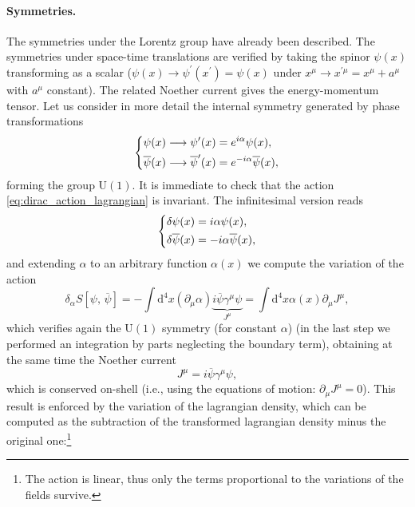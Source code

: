 \paragraph{Symmetries.}
The symmetries under the Lorentz group have already been described. The symmetries under space-time translations are verified by taking the spinor \(\psi(x)\) transforming as a scalar (\(\psi(x) \to \psi^{\prime}(x^{\prime}) = \psi(x)\) under \(x^{\mu} \to x^{\prime \mu} = x^{\mu} + a^{\mu}\) with \(a^{\mu}\) constant). The related Noether current gives the energy-momentum tensor.
Let us consider in more detail the internal symmetry generated by phase transformations
\begin{equation}
    \begin{dcases}
        \psi(x) \longrightarrow \psi^{\prime}(x) = e^{i \alpha} \psi(x), \\
        \overline{\psi}(x) \longrightarrow \overline{\psi}^{\prime}(x) = e^{-i \alpha} \overline{\psi}(x),
    \end{dcases}
    \label{eq:dirac_U1_transformation}
\end{equation}
forming the group \(\mathrm{U}(1)\). It is immediate to check that the action \eqref{eq:dirac_action_lagrangian} is invariant. The infinitesimal version reads
\[
    \begin{dcases}
        \delta \psi(x) = i \alpha \psi(x), \\
        \delta \overline{\psi}(x) = -i \alpha \overline{\psi}(x),
    \end{dcases}
\]
and extending \(\alpha\) to an arbitrary function \(\alpha(x)\) we compute the variation of the action
\[
    \delta_{\alpha} S [\psi,\,\overline{\psi}] = - \int \mathrm{d}^4 x (\partial_\mu \alpha) \underbrace{i \overline{\psi} \gamma^{\mu} \psi}_{J^{\mu}} = \int \mathrm{d}^4 x \alpha(x) \partial_{\mu} J^{\mu},
\]
which verifies again the \(\mathrm{U}(1)\) symmetry (for constant \(\alpha\)) (in the last step we performed an integration by parts neglecting the boundary term), obtaining at the same time the Noether current
\begin{equation}
    J^{\mu} = i \overline{\psi} \gamma^{\mu} \psi,
    \label{eq:dirac_noether_current_u1}
\end{equation}
which is conserved on-shell (i.e., using the equations of motion: \(\partial_{\mu}J^{\mu}=0\)). This result is enforced by the variation of the lagrangian density, which can be computed as the subtraction of the transformed lagrangian density minus the original one:\footnote{The action is linear, thus only the terms proportional to the variations of the fields survive.}
